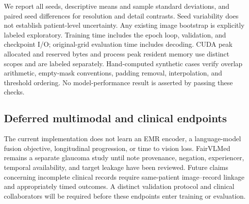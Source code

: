 We report all seeds, descriptive means and sample standard deviations, and paired seed differences for resolution and detail contrasts. Seed variability does not establish patient-level uncertainty. Any existing image bootstrap is explicitly labeled exploratory. Training time includes the epoch loop, validation, and checkpoint I/O; original-grid evaluation time includes decoding. CUDA peak allocated and reserved bytes and process peak resident memory use distinct scopes and are labeled separately. Hand-computed synthetic cases verify overlap arithmetic, empty-mask conventions, padding removal, interpolation, and threshold ordering. No model-performance result is asserted by passing these checks.

\subsection{Deferred multimodal and clinical endpoints}
The current implementation does not learn an EMR encoder, a language-model fusion objective, longitudinal progression, or time to vision loss. FairVLMed~\cite{luo2024} remains a separate glaucoma study until note provenance, negation, experiencer, temporal availability, and target leakage have been reviewed. Future claims concerning incomplete clinical records require same-patient image--record linkage and appropriately timed outcomes. A distinct validation protocol and clinical collaborators will be required before these endpoints enter training or evaluation.
